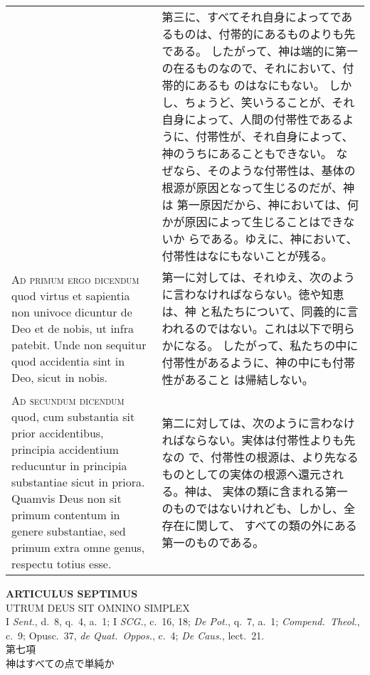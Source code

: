 \documentclass[10pt]{jsarticle} %
\begin{document}
\begin{longtable}{p{21em}p{21em}}
&

第三に、すべてそれ自身によってであるものは、付帯的にあるものよりも先である。
したがって、神は端的に第一の在るものなので、それにおいて、付帯的にあるも
 のはなにもない。
しかし、ちょうど、笑いうることが、それ自身によって、人間の付帯性であるよ
 うに、付帯性が、それ自身によって、神のうちにあることもできない。
なぜなら、そのような付帯性は、基体の根源が原因となって生じるのだが、神は
 第一原因だから、神においては、何かが原因によって生じることはできないか
 らである。ゆえに、神において、付帯性はなにもないことが残る。


\\

{\scshape Ad primum ergo dicendum} quod virtus et sapientia non univoce
 dicuntur de Deo et de nobis, ut infra patebit. Unde non sequitur quod
 accidentia sint in Deo, sicut in nobis.  &

第一に対しては、それゆえ、次のように言わなければならない。徳や知恵は、神
 と私たちについて、同義的に言われるのではない。これは以下で明らかになる。
 したがって、私たちの中に付帯性があるように、神の中にも付帯性があること
 は帰結しない。

\\

{\scshape Ad secundum dicendum} quod, cum substantia sit prior accidentibus,
 principia accidentium reducuntur in principia substantiae sicut in
 priora. Quamvis Deus non sit primum contentum in genere substantiae,
 sed primum extra omne genus, respectu totius esse.

&

第二に対しては、次のように言わなければならない。実体は付帯性よりも先なの
 で、付帯性の根源は、より先なるものとしての実体の根源へ還元される。神は、
 実体の類に含まれる第一のものではないけれども、しかし、全存在に関して、
 すべての類の外にある第一のものである。

 
\end{longtable}

\newpage
{}

\begin{center}
 {\Large {\bf ARTICULUS SEPTIMUS}}\\
 {\large UTRUM DEUS SIT OMNINO SIMPLEX}\\
 {\footnotesize I {\itshape Sent.}, d.~8, q.~4, a.~1; I {\itshape SCG.},
 c.~16, 18; {\itshape De Pot.}, q.~7, a.~1; {\itshape Compend.~Theol.},
 c.~9; Opusc.~37, {\itshape de Quat.~Oppos.}, c.~4; {\itshape De Caus.},
 lect.~21.}\\
 {\Large 第七項\\神はすべての点で単純か}
\end{center}
\end{document}
